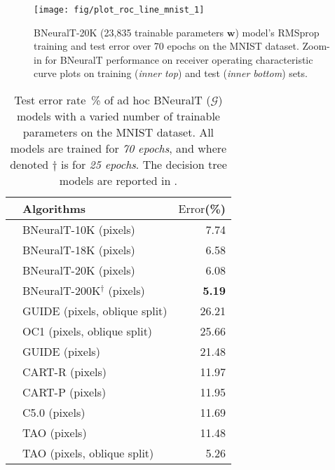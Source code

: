 \documentclass[11pt,a4paper]{article}
\begin{document}
    \begin{minipage}[t]{0.48\textwidth} 
   		\centering
   		\begin{figure}[H]
   			\centering
   			\texttt{[image: fig/plot\_roc\_line\_mnist\_1]}
   			\label{fig:mnist_performance}
   			\caption{BNeuralT-20K (23,835 trainable parameters $ \mathbf{w} $) model's RMSprop training and test error over 70 epochs on the MNIST dataset. Zoom-in for BNeuralT performance on receiver operating characteristic curve plots on training (\textit{inner top}) and test (\textit{inner bottom}) sets.}
   			\label{fig:BNeuralT_MNIST_ROC}
   		\end{figure}
   	\end{minipage}\quad
   	\begin{minipage}[t]{0.48\textwidth} 
   		\centering
   		\begin{table}[H]
   			\centering
   			\small
   			\renewcommand{\arraystretch}{1}
   			\setlength{\tabcolsep}{5pt}
   			\caption{Test error rate~\% of ad hoc BNeuralT  ($\mathcal{G}$) models with a varied number of trainable parameters on the MNIST dataset. All models are trained for \textit{70 epochs}, and where denoted $ \dagger $ is for \textit{25 epochs}. The decision tree models are reported in \citep{zharmagambetov2019experimental}. \label{tab:BNeuralT_MNSIT}}
   			\begin{tabular}{llr}
   				\toprule
   				\multicolumn{1}{c}{} & 
   				\multicolumn{1}{l}{Algorithms} & 
   				\multicolumn{1}{c}{$ \text{Error} $(\%)} \\ 
   				\midrule
   				\parbox[t]{2.8mm}{} 
   				& BNeuralT-10K (pixels) & 7.74 \\
   				& BNeuralT-18K (pixels) & 6.58 \\
   				& BNeuralT-20K (pixels) & 6.08 \\
   				& BNeuralT-200K$^\dagger$ (pixels)  & \textbf{5.19} \\[5pt]
\parbox[t]{2.8mm}{} 
   				& GUIDE (pixels, oblique split) & 26.21  \\
   				& OC1 (pixels, oblique split) & 25.66  \\
   				& GUIDE (pixels)    & 21.48  \\
   				& CART-R (pixels) & 11.97  \\
   				& CART-P (pixels) & 11.95  \\
   				& C5.0 (pixels)   & 11.69  \\
   				& TAO (pixels)    & 11.48  \\
   				& TAO (pixels, oblique split)  & 5.26 \\
   				\bottomrule
   				\hline 
   			\end{tabular} 
   		\end{table}
   	\end{minipage}
   	
\end{document}
